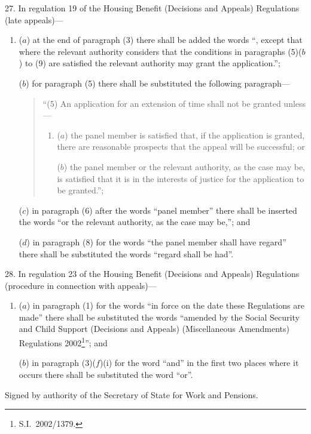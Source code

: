 \documentclass[12pt,a4paper]{article}
\begin{document}
27.  In regulation 19 of the Housing Benefit (Decisions and Appeals) Regulations (late appeals)—
\begin{enumerate}\item[]
($a$) at the end of paragraph (3) there shall be added the words “, except that where the relevant authority considers that the conditions in paragraphs (5)($b$)  to (9) are satisfied the relevant authority may grant the application.”;

($b$) for paragraph (5) there shall be substituted the following paragraph—
\begin{quotation}
“(5) An application for an extension of time shall not be granted unless—
\begin{enumerate}\item[]
($a$) the panel member is satisfied that, if the application is granted, there are reasonable prospects that the appeal will be successful; or

($b$) the panel member or the relevant authority, as the case may be, is satisfied that it is in the interests of justice for the application to be granted.”;
\end{enumerate}
\end{quotation}

($c$) in paragraph (6) after the words “panel member” there shall be inserted the words “or the relevant authority, as the case may be,”; and

($d$) in paragraph (8) for the words “the panel member shall have regard” there shall be substituted the words “regard shall be had”.
\end{enumerate}

\medskip

28.  In regulation 23 of the Housing Benefit (Decisions and Appeals) Regulations (procedure in connection with appeals)—
\begin{enumerate}\item[]
($a$) in paragraph (1) for the words “in force on the date these Regulations are made” there shall be substituted the words “amended by the Social Security and Child Support (Decisions and Appeals) (Miscellaneous Amendments) Regulations 2002\footnote{S.I.\ 2002/1379.}”; and

($b$) in paragraph (3)($f$)(i)  for the word “and” in the first two places where it occurs there shall be substituted the word “or”.
\end{enumerate}

\bigskip

Signed 
by authority of the Secretary of State for Work and Pensions.
\end{document}

